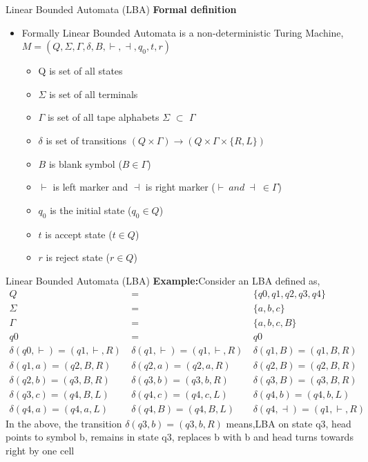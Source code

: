 \documentclass{beamer}
\begin{document}
\begin{frame}{Linear Bounded Automata (LBA)}
	\textbf{Formal definition}
	\begin{itemize}
		\item Formally Linear Bounded Automata is a non-deterministic Turing	Machine, $M=(Q,\Sigma, \Gamma, \delta,B,\vdash,\dashv,q_0, t,r)$

		\begin{itemize}
			\item Q is set of all states
			\item $\Sigma$ is set of all terminals
			\item $\Gamma$ is set of all tape alphabets $\Sigma$ $\subset$ $\Gamma$
			\item $\delta$ is set of transitions $(Q\times \Gamma)\rightarrow (Q\times \Gamma \times \{R,L\})$
			\item $B$ is blank symbol ($B \in \Gamma$)
			\item $\vdash$ is left marker and $\dashv$ is right marker ($\vdash \ and\ \dashv\  \in \Gamma$)
			\item $q_0$ is the initial state ($q_0 \in Q$)
			\item $t$ is accept state ($t \in Q$)
			\item $r$ is reject state ($r \in Q$)
		\end{itemize}
	\end{itemize}
\end{frame}
\begin{frame}{Linear Bounded Automata (LBA)}
	\textbf{Example:}Consider an LBA defined as,
	\begin{eqnarray*}
		Q &=& \{q0, q1, q2, q3, q4\}\\
		\Sigma &=& \{a, b, c\}\\
		\Gamma &=& \{a, b, c, B\}
\\
		q0 &=& q0\\
				\delta(q0, \vdash) = (q1, \vdash, R)\ & \delta(q1, \vdash) = (q1, \vdash,R )\ & \delta(q1, B) = (q1, B, R) \\
		\delta(q1, a) = (q2, B, R )\ &  \delta(q2, a) = (q2, a, R)\ & \delta(q2, B) = (q2, B, R) \\
		\delta(q2, b) = (q3, B, R)\ & \delta(q3, b) = (q3, b, R)\ & \delta(q3, B) = (q3, B, R) \\
		\delta(q3, c) = (q4, B, L)\ & \delta(q4, c) = (q4, c, L)\ & \delta(q4, b) = (q4, b, L) \\
		\delta(q4, a) = (q4, a, L)\ & \delta(q4, B) = (q4, B, L)\ & \delta(q4, \dashv) = (q1, \vdash, R) 
	\end{eqnarray*}
	In the above, the transition $\delta(q3, b) = (q3, b, R)$ means,LBA on state q3, head points to symbol b, remains in state q3, replaces b with b and head turns towards right by one
	cell
\end{frame}
\end{document}
